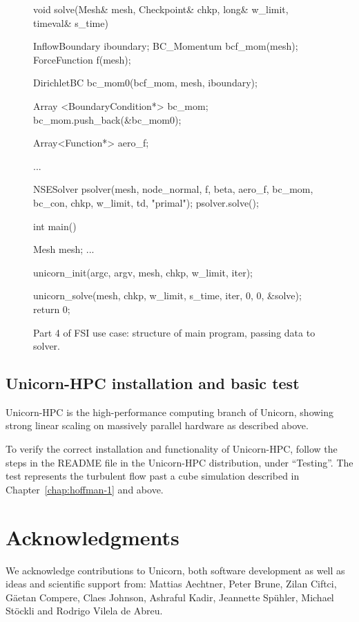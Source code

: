 \begin{figure}
\bwfig
\begin{c++}
void solve(Mesh& mesh, Checkpoint& chkp,
  long& w_limit, timeval& s_time)
{
  InflowBoundary iboundary;
  BC_Momentum bcf_mom(mesh);
  ForceFunction f(mesh);

  DirichletBC bc_mom0(bcf_mom, mesh, iboundary);

  Array <BoundaryCondition*> bc_mom;
  bc_mom.push_back(&bc_mom0);

  Array<Function*> aero_f;

  ...

  NSESolver psolver(mesh, node_normal, f, beta, aero_f, bc_mom, bc_con,
    chkp, w_limit, td, "primal");
  psolver.solve();
}

int main()
{
  Mesh mesh;
  ...

  unicorn_init(argc, argv, mesh, chkp, w_limit, iter);

  unicorn_solve(mesh, chkp, w_limit, s_time, iter, 0, 0, &solve);
  return 0;
}
\end{c++}
\caption{Part 4 of FSI use case: structure of main program, passing data to solver.}
\label{code:UseCasePart4}
\end{figure}

\subsection{Unicorn-HPC installation and basic test}

Unicorn-HPC is the high-performance computing branch of Unicorn,
showing strong linear scaling on massively parallel hardware as
described above.

To verify the correct installation and functionality of Unicorn-HPC,
follow the steps in the README file in the Unicorn-HPC distribution,
under ``Testing''. The test represents the turbulent flow past a cube
simulation described in Chapter~\ref{chap:hoffman-1} and above.

\section{Acknowledgments}

We acknowledge contributions to Unicorn, both software development as
well as ideas and scientific support from: Mattias Aechtner, Peter
Brune, Zilan Ciftci, G\"aetan Compere, Claes Johnson, Ashraful Kadir,
Jeannette Sp\"uhler, Michael St\"ockli and Rodrigo Vilela de Abreu.
